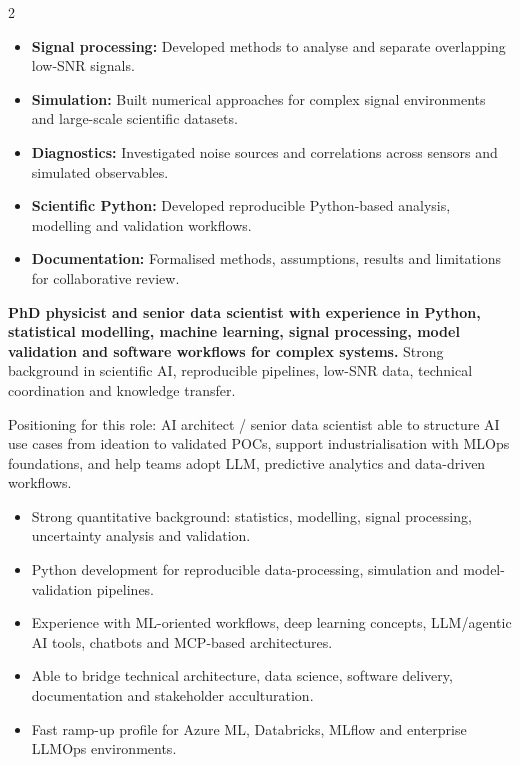 \documentclass[8pt,a4paper,ragged2e,withhyper]{../_shared/altacv}
\begin{document}
\begin{paracol}{2}
\begin{itemize}
  \item \textbf{Signal processing:} Developed methods to analyse and separate overlapping low-SNR signals.
  \item \textbf{Simulation:} Built numerical approaches for complex signal environments and large-scale scientific datasets.
  \item \textbf{Diagnostics:} Investigated noise sources and correlations across sensors and simulated observables.
  \item \textbf{Scientific Python:} Developed reproducible Python-based analysis, modelling and validation workflows.
  \item \textbf{Documentation:} Formalised methods, assumptions, results and limitations for collaborative review.
\end{itemize}

\switchcolumn


\textbf{PhD physicist and senior data scientist with experience in Python, statistical modelling, machine learning, signal processing, model validation and software workflows for complex systems.} Strong background in scientific AI, reproducible pipelines, low-SNR data, technical coordination and knowledge transfer.

Positioning for this role: AI architect / senior data scientist able to structure AI use cases from ideation to validated POCs, support industrialisation with MLOps foundations, and help teams adopt LLM, predictive analytics and data-driven workflows.

\begin{itemize}
  \item Strong quantitative background: statistics, modelling, signal processing, uncertainty analysis and validation.
  \item Python development for reproducible data-processing, simulation and model-validation pipelines.
  \item Experience with ML-oriented workflows, deep learning concepts, LLM/agentic AI tools, chatbots and MCP-based architectures.
  \item Able to bridge technical architecture, data science, software delivery, documentation and stakeholder acculturation.
  \item Fast ramp-up profile for Azure ML, Databricks, MLflow and enterprise LLMOps environments.
\end{itemize}


\end{paracol}
\end{document}
